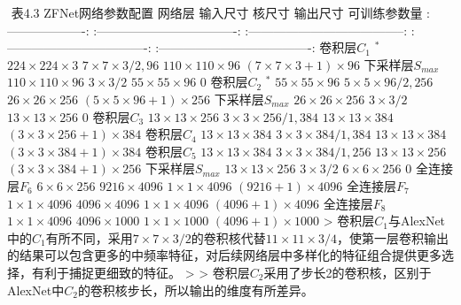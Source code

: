 ​ 表4.3 ZFNet网络参数配置 \textbar{} 网络层 \textbar{} 输入尺寸
\textbar{} 核尺寸 \textbar{} 输出尺寸 \textbar{} 可训练参数量 \textbar{}
\textbar{} :-------------------: \textbar{}
:----------------------------------: \textbar{}
:--------------------------------------: \textbar{}
:----------------------------------: \textbar{}
:-------------------------------------: \textbar{} \textbar{}
卷积层\(C_1\) \(^*\) \textbar{} \(224\times224\times3\) \textbar{}
\(7\times7\times3/2,96\) \textbar{} \(110\times110\times96\) \textbar{}
\((7\times7\times3+1)\times96\) \textbar{} \textbar{}
下采样层\(S_{max}\) \textbar{} \(110\times110\times96\) \textbar{}
\(3\times3/2\) \textbar{} \(55\times55\times96\) \textbar{} 0 \textbar{}
\textbar{} 卷积层\(C_2\) \(^*\) \textbar{} \(55\times55\times96\)
\textbar{} \(5\times5\times96/2,256\) \textbar{} \(26\times26\times256\)
\textbar{} \((5\times5\times96+1)\times256\) \textbar{} \textbar{}
下采样层\(S_{max}\) \textbar{} \(26\times26\times256\) \textbar{}
\(3\times3/2\) \textbar{} \(13\times13\times256\) \textbar{} 0
\textbar{} \textbar{} 卷积层\(C_3\) \textbar{} \(13\times13\times256\)
\textbar{} \(3\times3\times256/1,384\) \textbar{}
\(13\times13\times384\) \textbar{} \((3\times3\times256+1)\times384\)
\textbar{} \textbar{} 卷积层\(C_4\) \textbar{} \(13\times13\times384\)
\textbar{} \(3\times3\times384/1,384\) \textbar{}
\(13\times13\times384\) \textbar{} \((3\times3\times384+1)\times384\)
\textbar{} \textbar{} 卷积层\(C_5\) \textbar{} \(13\times13\times384\)
\textbar{} \(3\times3\times384/1,256\) \textbar{}
\(13\times13\times256\) \textbar{} \((3\times3\times384+1)\times256\)
\textbar{} \textbar{} 下采样层\(S_{max}\) \textbar{}
\(13\times13\times256\) \textbar{} \(3\times3/2\) \textbar{}
\(6\times6\times256\) \textbar{} 0 \textbar{} \textbar{} 全连接层\(F_6\)
\textbar{} \(6\times6\times256\) \textbar{} \(9216\times4096\)
\textbar{} \(1\times1\times4096\) \textbar{} \((9216+1)\times4096\)
\textbar{} \textbar{} 全连接层\(F_7\) \textbar{} \(1\times1\times4096\)
\textbar{} \(4096\times4096\) \textbar{} \(1\times1\times4096\)
\textbar{} \((4096+1)\times4096\) \textbar{} \textbar{} 全连接层\(F_8\)
\textbar{} \(1\times1\times4096\) \textbar{} \(4096\times1000\)
\textbar{} \(1\times1\times1000\) \textbar{} \((4096+1)\times1000\)
\textbar{} \textgreater{}
卷积层\(C_1\)与AlexNet中的\(C_1\)有所不同，采用\(7\times7\times3/2\)的卷积核代替\(11\times11\times3/4​\)，使第一层卷积输出的结果可以包含更多的中频率特征，对后续网络层中多样化的特征组合提供更多选择，有利于捕捉更细致的特征。
\textgreater{} \textgreater{}
卷积层\(C_2\)采用了步长2的卷积核，区别于AlexNet中\(C_2\)的卷积核步长，所以输出的维度有所差异。

